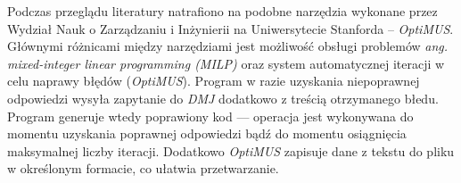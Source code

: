 Podczas przeglądu literatury natrafiono na podobne narzędzia wykonane przez Wydział Nauk o Zarządzaniu i Inżynierii na Uniwersytecie Stanforda -- \textit{OptiMUS}. Głównymi różnicami między narzędziami jest możliwość obsługi problemów \textit{ang. mixed-integer linear programming (MILP)} oraz system automatycznej iteracji w celu naprawy błędów (\textit{OptiMUS}). Program w razie uzyskania niepoprawnej odpowiedzi wysyła zapytanie do \textit{DMJ} dodatkowo z treścią otrzymanego błedu. Program generuje wtedy poprawiony kod --- operacja jest wykonywana do momentu uzyskania poprawnej odpowiedzi bądź do momentu osiągnięcia maksymalnej liczby iteracji. Dodatkowo \textit{OptiMUS} zapisuje dane z tekstu do pliku w określonym formacie, co ułatwia przetwarzanie. \label{sec:optimus}


